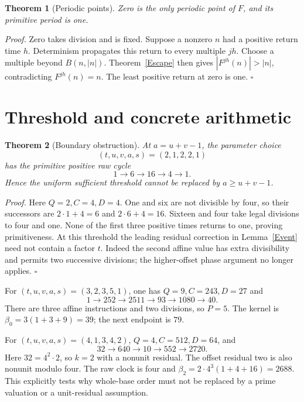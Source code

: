 \documentclass[11pt,letterpaper]{article}
\newtheorem{theorem}{Theorem}
\newenvironment{proof}{\noindent\textit{Proof.}}{\hfill\(\square\)}
\begin{document}
\begin{theorem}[Periodic points]\label{Periodic}
Zero is the only periodic point of \(F\), and its primitive period is one.
\end{theorem}
\begin{proof}
Zero takes division and is fixed. Suppose a nonzero \(n\) had a positive
return time \(h\). Determinism propagates this return to every multiple
\(jh\). Choose a multiple beyond \(B(n,|n|)\). Theorem~\ref{Escape} then gives
\(|F^{jh}(n)|>|n|\), contradicting \(F^{jh}(n)=n\).
The least positive return at zero is one.
\end{proof}

\section{Threshold and concrete arithmetic}

\begin{theorem}[Boundary obstruction]\label{Boundary}
At \(a=u+v-1\), the parameter choice
\[
(t,u,v,a,s)=(2,1,2,2,1)
\]
has the primitive positive raw cycle
\[
1\longrightarrow6\longrightarrow16\longrightarrow4\longrightarrow1.
\]
Hence the uniform sufficient threshold cannot be replaced by \(a\ge u+v-1\).
\end{theorem}
\begin{proof}
Here \(Q=2,C=4,D=4\). One and six are not divisible by four, so their
successors are \(2\cdot1+4=6\) and \(2\cdot6+4=16\).
Sixteen and four take legal divisions to four and one.
None of the first three positive times returns to one, proving primitiveness.
At this threshold the leading residual correction in Lemma~\ref{Event}
need not contain a factor \(t\). Indeed the second affine value has extra
divisibility and permits two successive divisions; the higher-offset phase
argument no longer applies.
\end{proof}

For \((t,u,v,a,s)=(3,2,3,5,1)\), one has \(Q=9,C=243,D=27\) and
\[
1\longrightarrow252\longrightarrow2511\longrightarrow93
\longrightarrow1080\longrightarrow40.
\]
There are three affine instructions and two divisions, so \(P=5\).
The kernel is \(\beta_0=3(1+3+9)=39\); the next endpoint is \(79\).

For \((t,u,v,a,s)=(4,1,3,4,2)\), \(Q=4,C=512,D=64\), and
\[
32\longrightarrow640\longrightarrow10\longrightarrow552\longrightarrow2720.
\]
Here \(32=4^2\cdot2\), so \(k=2\) with a nonunit residual.
The offset residual two is also nonunit modulo four.
The raw clock is four and \(\beta_2=2\cdot4^3(1+4+16)=2688\).
This explicitly tests why whole-base order must not be replaced by a prime
valuation or a unit-residual assumption.
\end{document}
